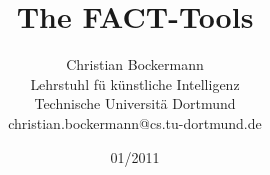 \documentclass{TechReport}
\date{01/2011}  %
\title{The FACT-Tools}
\author{Christian Bockermann\\
  Lehrstuhl f\"u k\"unstliche Intelligenz\\
  Technische Universit\"a Dortmund\\
  christian.bockermann@cs.tu-dortmund.de}
\date{}
\begin{document}
\makesfbtitlepage







{}

\end{document}
